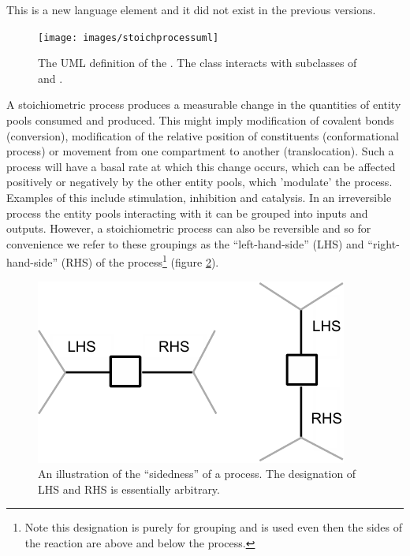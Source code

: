 This is a new language element and it did not exist in the previous versions.










\label{defn:StoichiometricProcess}\label{sec:techref:stoichiometricprocess}

\begin{figure}[htb]
  \centering
  \texttt{[image: images/stoichprocessuml]}
  \caption{The UML definition of the
    . The class interacts with
    subclasses of  and .}
  \label{fig:techref:stoichprocessuml}
\end{figure}

A stoichiometric process produces a measurable change in the
quantities of entity pools consumed and produced. This might imply
modification of covalent bonds (conversion), modification of the
relative position of constituents (conformational process) or movement
from one compartment to another (translocation). Such a process will
have a basal rate at which this change occurs, which can be affected
positively or negatively by the other entity pools, which 'modulate'
the process. Examples of this include stimulation, inhibition and
catalysis. In an irreversible process the entity pools interacting
with it can be grouped into inputs and outputs. However, a
stoichiometric process can also be reversible and so for convenience
we refer to these groupings as the ``left-hand-side'' (LHS) and
``right-hand-side'' (RHS) of the process\footnote{Note this
  designation is purely for grouping and is used even then the sides
  of the reaction are above and below the process.}  (figure
\ref{fig:techref:process-sidedness}).

\begin{figure}[htb]
  \centering
  \includegraphics[scale = 0.4]{images/process_sidedness}
  \caption{An illustration of the ``sidedness'' of a process. The designation of LHS and RHS is essentially arbitrary.}
  \label{fig:techref:process-sidedness}
\end{figure}


